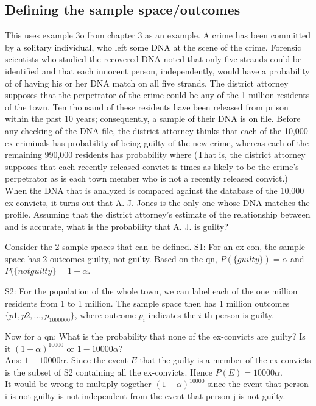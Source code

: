 \documentclass{article}
\begin{document}
\subsection{Defining the sample space/outcomes}
This uses example 3o from chapter 3 as an example.
A crime has been committed by a solitary individual, who left some DNA at the
scene of the crime. Forensic scientists who studied the recovered DNA noted
that only five strands could be identified and that each innocent person,
independently, would have a probability of of having his or her DNA match
on all five strands. The district attorney supposes that the perpetrator of the crime
could be any of the 1 million residents of the town. Ten thousand of these
residents have been released from prison within the past 10 years; consequently,
a sample of their DNA is on file. Before any checking of the DNA file, the district
attorney thinks that each of the 10,000 ex-criminals has probability of being
guilty of the new crime, whereas each of the remaining 990,000 residents has
probability where (That is, the district attorney supposes that each
recently released convict is times as likely to be the crime’s perpetrator as is
each town member who is not a recently released convict.) When the DNA that is
analyzed is compared against the database of the 10,000 ex-convicts, it turns out
that A. J. Jones is the only one whose DNA matches the profile. Assuming that
the district attorney’s estimate of the relationship between and is accurate,
what is the probability that A. J. is guilty?

Consider the 2 sample spaces that can be defined.
S1: For an ex-con, the sample space has 2 outcomes {guilty, not guilty}. Based on the qn, $P(\{guilty\}) = \alpha$ and $P(\{not guilty\}=1-\alpha$.

S2: For the population of the whole town, we can label each of the one million residents from 1 to 1 million. The sample space then has 1 million outcomes $\{p1, p2, \dots, p_{1000000}\}$, where outcome $p_i$ indicates the $i$-th person is guilty.

Now for a qn: What is the probability that none of the ex-convicts are guilty?
Is it $(1-\alpha)^{10000}$ or $1-10000\alpha$?\\
Ans: $1-10000\alpha$. Since the event $E$ that the guilty is a member of the ex-convicts is the subset of S2 containing all the ex-convicts. Hence $P(E)=10000\alpha$.\\
It would be wrong to multiply together $(1-\alpha)^{10000}$ since the event that person i is not guilty is not independent from the event that person j is not guilty.
\end{document}
